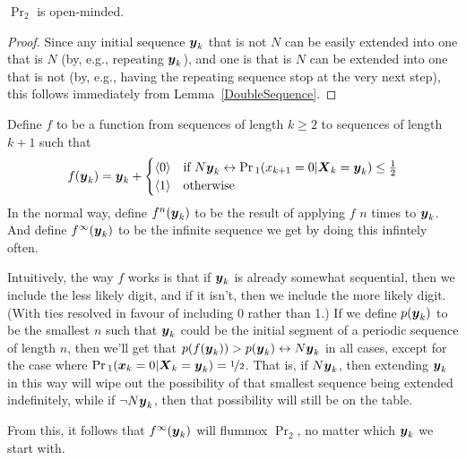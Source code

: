 %
%
\begin{lemma}
\label{Open}
$\Pr_2$ is open-minded.
\end{lemma}
\begin{proof}
Since any initial sequence $\boldsymbol{y}_k$ that is not $N$ can be easily extended into one that is $N$ (by, e.g., repeating $\boldsymbol{y}_k$), and one is that is $N$ can be extended into one that is not (by, e.g., having the repeating sequence stop at the very next step), this follows immediately from Lemma~\ref{DoubleSequence}.
\end{proof}
%
\noindent Define $f$ to be a function from sequences of length $k \geq 2$ to sequences of length $k+1$ such that 
\begin{equation}
f(\boldsymbol{y}_k) = \boldsymbol{y}_k + 
	\begin{cases} 
		\langle 0 \rangle &\text{if } N\boldsymbol{y}_k \leftrightarrow \Pr{}_1(x_{k+1} = 0 | \boldsymbol{X}_k = \boldsymbol{y}_k) \leq \frac{1}{2} \\
		\langle 1 \rangle &\text{otherwise}
	\end{cases}
\end{equation}
%
%
%
In the normal way, define $f^n(\boldsymbol{y}_k)$ to be the result of applying $f$ $n$ times to $\boldsymbol{y}_k$. And define $f^\infty(\boldsymbol{y}_k)$ to be the infinite sequence we get by doing this infintely often.

Intuitively, the way $f$ works is that if $\boldsymbol{y}_k$ is already somewhat sequential, then we include the less likely digit, and if it isn't, then we include the more likely digit. (With ties resolved in favour of including 0 rather than 1.) If we define $p(\boldsymbol{y}_k)$ to be the smallest $n$ such that $\boldsymbol{y}_k$ could be the initial segment of a periodic sequence of length $n$, then we'll get that $p(f(\boldsymbol{y}_k)) > p(\boldsymbol{y}_k) \leftrightarrow N\boldsymbol{y}_k$ in all cases, except for the case where $\Pr{}_1(\boldsymbol{x}_k = 0 | \boldsymbol{X}_k = \boldsymbol{y}_k) = \nicefrac{1}{2}$. That is, if $N\boldsymbol{y}_k$, then extending $\boldsymbol{y}_k$ in this way will wipe out the possibility of that smallest sequence being extended indefinitely, while if $\neg N\boldsymbol{y}_k$, then that possibility will still be on the table. 

From this, it follows that $f^{\infty}(\boldsymbol{y}_k)$ will flummox $\Pr_2$, no matter which $\boldsymbol{y}_k$ we start with.

